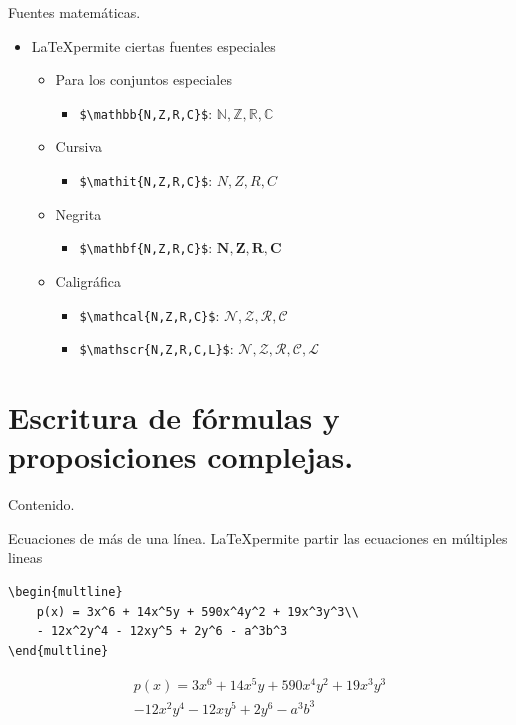 \documentclass[dvipsnames,xcolor, handout]{beamer}
\theoremstyle{plain}
\theoremstyle{definition}
\begin{document}
\begin{frame}[fragile]{Fuentes matemáticas.}
\begin{itemize}
    \item \LaTeX permite ciertas fuentes especiales
    \begin{itemize}
        \item Para los conjuntos especiales
        \begin{itemize}
            \item \verb!$\mathbb{N,Z,R,C}$!: $\mathbb{N,Z,R,C}$
        \end{itemize}\pause
        \item Cursiva
        \begin{itemize}
            \item \verb!$\mathit{N,Z,R,C}$!: $\mathit{N,Z,R,C}$
        \end{itemize}\pause
    \item Negrita
        \begin{itemize}
            \item \verb!$\mathbf{N,Z,R,C}$!: $\mathbf{N,Z,R,C}$
        \end{itemize}\pause
    \item Caligráfica
        \begin{itemize}
            \item \verb!$\mathcal{N,Z,R,C}$!: $\mathcal{N,Z,R,C}$
            \item \verb!$\mathscr{N,Z,R,C,L}$!: $\mathscr{N,Z,R,C,L}$
        \end{itemize}
    \end{itemize}
\end{itemize}    
\end{frame}

\section{Escritura de fórmulas y proposiciones complejas.}

\begin{frame}{Contenido.}
  \tableofcontents[currentsection]
\end{frame}

\begin{frame}[fragile]{Ecuaciones de más de una línea.}
\LaTeX permite partir las ecuaciones en múltiples lineas
\begin{verbatim}
\begin{multline}
    p(x) = 3x^6 + 14x^5y + 590x^4y^2 + 19x^3y^3\\ 
    - 12x^2y^4 - 12xy^5 + 2y^6 - a^3b^3
\end{multline}
\end{verbatim}

\begin{multline}
p(x) = 3x^6 + 14x^5y + 590x^4y^2 + 19x^3y^3\\ 
- 12x^2y^4 - 12xy^5 + 2y^6 - a^3b^3
\end{multline}
    
\end{frame}
\end{document}
